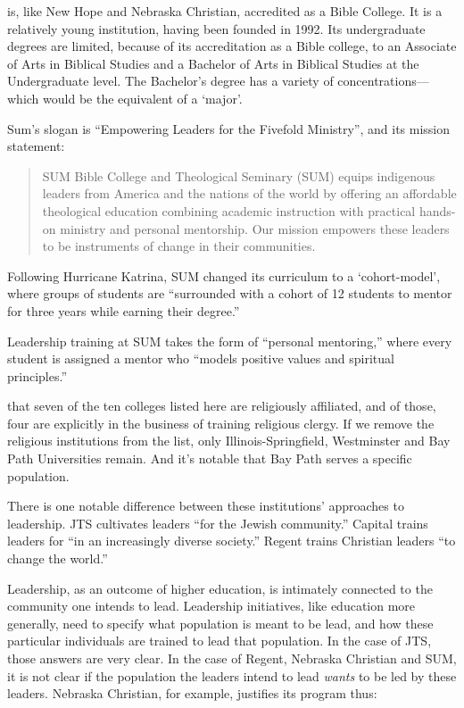  is, like New Hope and Nebraska Christian, accredited as a Bible College. It is a relatively young institution, having been founded in 1992. Its undergraduate degrees are limited, because of its accreditation as a Bible college, to an Associate of Arts in Biblical Studies and a Bachelor of Arts in Biblical Studies at the Undergraduate level. The Bachelor's degree has a variety of concentrations---which would be the equivalent of a `major'.

Sum's slogan is ``Empowering Leaders for the Fivefold Ministry'', and its mission statement:

\begin{quote}

SUM Bible College and Theological Seminary (SUM) equips indigenous leaders from America and the nations of the world by offering an affordable theological education combining academic instruction with practical hands-on ministry and personal mentorship. Our mission empowers these leaders to be instruments of change in their communities.
\end{quote}

Following Hurricane Katrina, SUM changed its curriculum to a `cohort-model', where groups of students are ``surrounded with a cohort of 12 students to mentor for three years while earning their degree.''

Leadership training at SUM takes the form of ``personal mentoring,'' where every student is assigned a mentor who ``models positive values and spiritual principles.'' 

 that seven of the ten colleges listed here are religiously affiliated, and of those, four are explicitly in the business of training religious clergy. If we remove the religious institutions from the list, only Illinois-Springfield, Westminster and Bay Path Universities remain. And it's notable that Bay Path serves a specific population. 

There is one notable difference between these institutions' approaches to leadership. JTS cultivates leaders ``for the Jewish community.'' Capital trains leaders for ``in an increasingly diverse society.'' Regent trains Christian leaders ``to change the world.'' 

Leadership, as an outcome of higher education, is intimately connected to the community one intends to lead. Leadership initiatives, like education more generally, need to specify what population is meant to be lead, and how these particular individuals are trained to lead that population. In the case of JTS, those answers are very clear. In the case of Regent, Nebraska Christian and SUM, it is not clear if the population the leaders intend to lead \emph{wants} to be led by these leaders. Nebraska Christian, for example, justifies its program thus:

